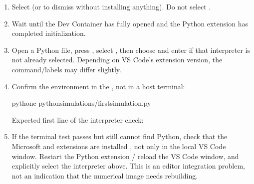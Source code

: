 \documentclass[letterpaper,10pt,english]{sphinxmanual}
\begin{document}
\sphinxAtStartPar
{}
\begin{enumerate}
%
\item {} 
\sphinxAtStartPar
Select  (or  to dismiss without
installing anything). Do not select .

\item {} 
\sphinxAtStartPar
Wait until the Dev Container has fully opened and the Python
extension has completed initialization.

\item {} 
\sphinxAtStartPar
Open a Python file, press , select
, then choose  and enter  if
that interpreter is not already selected. Depending on VS Code’s
extension version, the command/labels may differ slightly.

\item {} 
\sphinxAtStartPar
Confirm the environment in the , not in a host terminal:

\begin{sphinxVerbatim}[commandchars=\\\{\}]
python\PYGZhy{}c
pythonsimulations/first\PYGZus{}simulation.py
\end{sphinxVerbatim}

\sphinxAtStartPar
Expected first line of the interpreter check:

\begin{sphinxVerbatim}[commandchars=\\\{\}]
\end{sphinxVerbatim}

\item {} 
\sphinxAtStartPar
If the terminal test passes but  still cannot find Python,
check that the Microsoft  and 
extensions are installed , not
only in the local VS Code window. Restart the Python extension /
reload the VS Code window, and explicitly select the interpreter
above. This is an editor integration problem, not an indication
that the numerical image needs rebuilding.

\end{enumerate}
\end{document}
